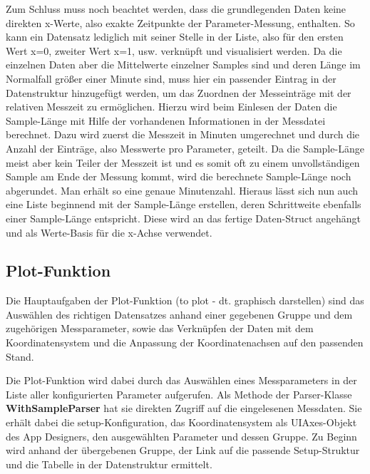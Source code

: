 Zum Schluss muss noch beachtet werden, dass die grundlegenden Daten keine direkten x-Werte, also exakte Zeitpunkte der Parameter-Messung, enthalten. So kann ein Datensatz lediglich mit seiner Stelle in der Liste, also für den ersten Wert x=0, zweiter Wert x=1, usw. verknüpft und visualisiert werden. Da die einzelnen Daten aber die Mittelwerte einzelner Samples sind und deren Länge im Normalfall größer einer Minute sind, muss hier ein passender Eintrag in der Datenstruktur hinzugefügt werden, um das Zuordnen der Messeinträge mit der relativen Messzeit zu ermöglichen. Hierzu wird beim Einlesen der Daten die Sample-Länge mit Hilfe der vorhandenen Informationen in der Messdatei berechnet. Dazu wird zuerst die Messzeit in Minuten umgerechnet und durch die Anzahl der Einträge, also Messwerte pro Parameter, geteilt. Da die Sample-Länge meist aber kein Teiler der Messzeit ist und es somit oft zu einem unvollständigen Sample am Ende der Messung kommt, wird die berechnete Sample-Länge noch abgerundet. Man erhält so eine genaue Minutenzahl. Hieraus lässt sich nun auch eine Liste beginnend mit der Sample-Länge erstellen, deren Schrittweite ebenfalls einer Sample-Länge entspricht. Diese wird an das fertige Daten-Struct angehängt und als Werte-Basis für die x-Achse verwendet.

\begin{minipage}{\linewidth}

\end{minipage}

\subsection{Plot-Funktion}

Die Hauptaufgaben der Plot-Funktion (to plot - dt. graphisch darstellen) sind das Auswählen des richtigen Datensatzes anhand einer gegebenen Gruppe und dem zugehörigen Messparameter, sowie das Verknüpfen der Daten mit dem Koordinatensystem und die Anpassung der Koordinatenachsen auf den passenden Stand.

Die Plot-Funktion wird dabei durch das Auswählen eines Messparameters in der Liste aller konfigurierten Parameter aufgerufen. Als Methode der Parser-Klasse \textbf{WithSampleParser} hat sie direkten Zugriff auf die eingelesenen Messdaten. Sie erhält dabei die setup-Konfiguration, das Koordinatensystem als UIAxes-Objekt des App Designers, den ausgewählten Parameter und dessen Gruppe. Zu Beginn wird anhand der übergebenen Gruppe, der Link auf die passende Setup-Struktur und die Tabelle in der Datenstruktur ermittelt.

